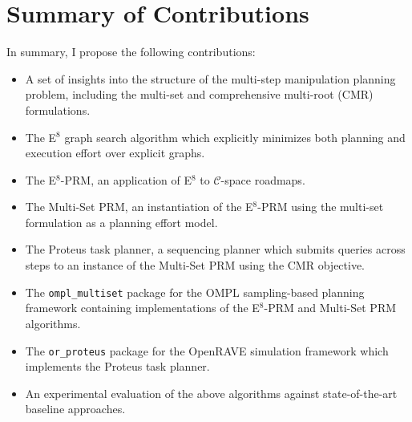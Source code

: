 \section*{Summary of Contributions}

In summary,
I propose the following contributions:
\begin{itemize}
\itemsep-3pt
\item A set of insights into the structure of the
   multi-step manipulation planning problem,
   including the multi-set and comprehensive multi-root (CMR)
   formulations.
\item The E$^8$ graph search algorithm which explicitly minimizes
   both planning and execution effort over explicit graphs.
\item The E$^8$-PRM, an application of E$^8$ to
   $\mathcal{C}$-space roadmaps.
\item The Multi-Set PRM, an instantiation of the E$^8$-PRM
   using the multi-set formulation as a planning effort model.
\item The {\sc Proteus} task planner,
   a sequencing planner which submits queries across steps
   to an instance of the Multi-Set PRM using the CMR objective.
\item The {\tt ompl\_multiset} package
   for the OMPL\citep{sucan2012ompl} sampling-based planning framework
   containing implementations of the E$^8$-PRM and Multi-Set PRM
   algorithms.
\item The {\tt or\_proteus} package for the
   OpenRAVE\citep{diankov2010openrave} simulation framework
   which implements the {\sc Proteus} task planner.
\item An experimental evaluation of the above algorithms against
   state-of-the-art baseline approaches.
\end{itemize}

